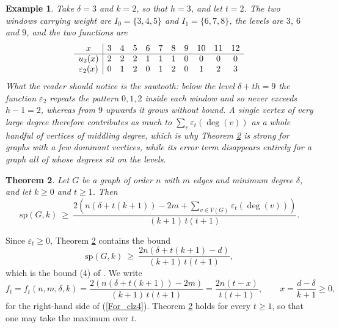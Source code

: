 \documentclass[12pt,a4paper]{article}%
\newtheorem{theorem}{Theorem}
\newtheorem{example}[theorem]{Example}
\begin{document}
\begin{example}
\label{Ex_eps}Take $\delta =3$ and $k=2$, so that $h=3$, and let $t=2$. The two
windows carrying weight are $I_{0}=\{3,4,5\}$ and $I_{1}=\{6,7,8\}$, the levels
are $3$, $6$ and $9$, and the two functions are
\[
\begin{array}
[c]{c|cccccccccc}%
x & 3 & 4 & 5 & 6 & 7 & 8 & 9 & 10 & 11 & 12\\\hline
u_{2}(x) & 2 & 2 & 2 & 1 & 1 & 1 & 0 & 0 & 0 & 0\\
\varepsilon _{2}(x) & 0 & 1 & 2 & 0 & 1 & 2 & 0 & 1 & 2 & 3
\end{array}
\]
What the reader should notice is the sawtooth: below the level $\delta +th=9$
the function $\varepsilon _{2}$ repeats the pattern $0,1,2$ inside each window
and so never exceeds $h-1=2$, whereas from $9$ upwards it grows without bound.
A single vertex of very large degree therefore contributes as much to
$\sum_{v}\varepsilon _{t}(\deg (v))$ as a whole handful of vertices of middling
degree, which is why Theorem \ref{Tm_gen} is strong for graphs with a few
dominant vertices, while its error term disappears entirely for a graph all of
whose degrees sit on the levels.
\end{example}



\begin{theorem}
\label{Tm_gen}Let $G$ be a graph of order $n$ with $m$ edges and minimum degree $\delta $, and let
$k\geq 0$ and $t\geq 1$. Then
\[
\mathrm{sp}(G,k)\ \geq \ \frac{2\left( n\left( \delta +t(k+1)\right) -2m+\sum_{v\in V(G)}%
\varepsilon _{t}(\deg (v))\right) }{(k+1)\,t(t+1)} .
\]
\end{theorem}

Since $\varepsilon _{t}\geq 0$, Theorem \ref{Tm_gen} contains the bound
\begin{equation}
\mathrm{sp}(G,k)\ \geq \ \frac{2n\left( \delta +t(k+1)-d\right) }{(k+1)\,t(t+1)},
\label{For_clz4}%
\end{equation}
which is the bound (4) of \cite{CaroLauriZarb}. We write
\[
f_{t}=f_{t}(n,m,\delta ,k)=\frac{2\left( n(\delta +t(k+1))-2m\right) }{(k+1)\,t(t+1)}=\frac{2n(t-x)}%
{t(t+1)},\qquad x=\frac{d-\delta }{k+1}\geq 0,
\]
for the right-hand side of (\ref{For_clz4}). Theorem \ref{Tm_gen} holds for every $t\geq 1$, so that one may take
the maximum over $t$.
\end{document}
